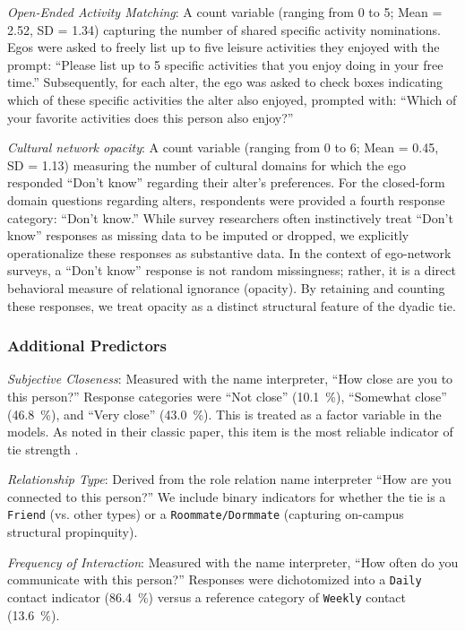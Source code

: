 \documentclass[
  letterpaper,
  DIV=11,
  numbers=noendperiod]{scrartcl}
\def\percent{\%}%
\begin{document}
\emph{Open-Ended Activity Matching}: A count variable (ranging from 0 to 5; Mean = 2.52, SD = 1.34) capturing the number of shared specific activity nominations. Egos were asked to freely list up to five leisure activities they enjoyed with the prompt: ``Please list up to 5 specific activities that you enjoy doing in your free time.'' Subsequently, for each alter, the ego was asked to check boxes indicating which of these specific activities the alter also enjoyed, prompted with: ``Which of your favorite activities does this person also enjoy?''

\emph{Cultural network opacity}: A count variable (ranging from 0 to 6; Mean = 0.45, SD = 1.13) measuring the number of cultural domains for which the ego responded ``Don't know'' regarding their alter’s preferences. For the closed-form domain questions regarding alters, respondents were provided a fourth response category: ``Don't know.'' While survey researchers often instinctively treat ``Don't know'' responses as missing data to be imputed or dropped, we explicitly operationalize these responses as substantive data. In the context of ego-network surveys, a ``Don't know'' response is not random missingness; rather, it is a direct behavioral measure of relational ignorance (opacity). By retaining and counting these responses, we treat opacity as a distinct structural feature of the dyadic tie.

\subsubsection{Additional Predictors}

\emph{Subjective Closeness}: Measured with the name interpreter, ``How close are you to this person?'' Response categories were ``Not close'' (\SI{10.1}{\percent}), ``Somewhat close'' (\SI{46.8}{\percent}), and ``Very close'' (\SI{43.0}{\percent}). This is treated as a factor variable in the models. As \citet{marsden1984measuring-f62} noted in their classic paper, this item is the most reliable indicator of tie strength \citep{granovetter1973strength-f5f}.

\emph{Relationship Type}: Derived from the role relation name interpreter ``How are you connected to this person?'' We include binary indicators for whether the tie is a \texttt{Friend} (vs. other types) or a \texttt{Roommate/Dormmate} (capturing on-campus structural propinquity).

\emph{Frequency of Interaction}: Measured with the name interpreter, ``How often do you communicate with this person?'' Responses were dichotomized into a \texttt{Daily} contact indicator (\SI{86.4}{\percent}) versus a reference category of \texttt{Weekly} contact (\SI{13.6}{\percent}).
\end{document}
